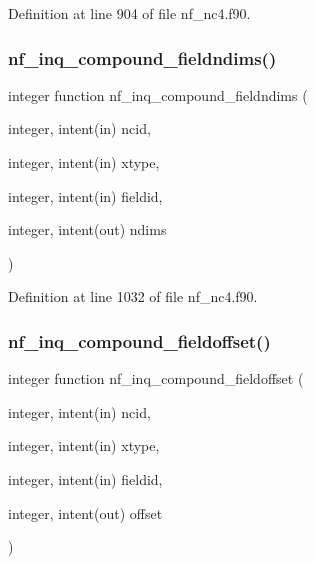 Definition at line 904 of file nf\+\_\+nc4.\+f90.

\mbox{\label{nf__nc4_8f90_ad75401d8a7c1ae30532f730d8a540815}} 
\subsubsection{\texorpdfstring{nf\+\_\+inq\+\_\+compound\+\_\+fieldndims()}{nf\_inq\_compound\_fieldndims()}}
{\footnotesize\ttfamily integer function nf\+\_\+inq\+\_\+compound\+\_\+fieldndims (\begin{DoxyParamCaption}\item[{integer, intent(in)}]{ncid,  }\item[{integer, intent(in)}]{xtype,  }\item[{integer, intent(in)}]{fieldid,  }\item[{integer, intent(out)}]{ndims }\end{DoxyParamCaption})}



Definition at line 1032 of file nf\+\_\+nc4.\+f90.

\mbox{\label{nf__nc4_8f90_a176c098f3bb7affadd26ec756508acfe}} 
\subsubsection{\texorpdfstring{nf\+\_\+inq\+\_\+compound\+\_\+fieldoffset()}{nf\_inq\_compound\_fieldoffset()}}
{\footnotesize\ttfamily integer function nf\+\_\+inq\+\_\+compound\+\_\+fieldoffset (\begin{DoxyParamCaption}\item[{integer, intent(in)}]{ncid,  }\item[{integer, intent(in)}]{xtype,  }\item[{integer, intent(in)}]{fieldid,  }\item[{integer, intent(out)}]{offset }\end{DoxyParamCaption})}



